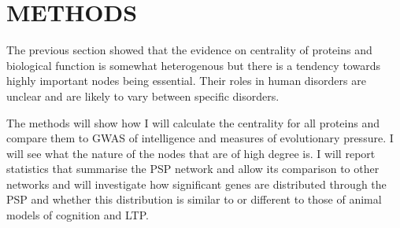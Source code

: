   







\section{METHODS}
The previous section showed that the evidence on centrality of proteins and biological function is somewhat heterogenous but there is a tendency towards highly important nodes being essential. Their roles in human disorders are unclear and are likely to vary between specific disorders. 
  
  The methods will show how I will calculate the centrality for all proteins and compare them to GWAS of intelligence and measures of evolutionary pressure. I will see what the nature of the nodes that are of high degree is. I will report statistics that summarise the PSP network and allow its comparison to other networks and will investigate how significant genes are distributed through the PSP and whether this distribution is similar to or different to those of animal models of cognition and LTP. 
